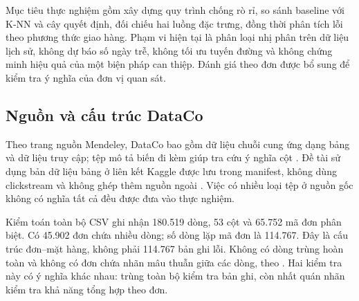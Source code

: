 Mục tiêu thực nghiệm gồm xây dựng quy trình chống rò rỉ, so sánh baseline
với K-NN và cây quyết định, đối chiếu hai luồng đặc trưng, đồng thời phân
tích lỗi theo phương thức giao hàng. Phạm vi hiện tại là phân loại nhị phân
trên dữ liệu lịch sử, không dự báo số ngày trễ, không tối ưu tuyến đường và
không chứng minh hiệu quả của một biện pháp can thiệp. Đánh giá theo đơn
được bổ sung để kiểm tra ý nghĩa của đơn vị quan sát.

\subsection{Nguồn và cấu trúc DataCo}
Theo trang nguồn Mendeley, DataCo bao gồm dữ liệu chuỗi cung ứng dạng bảng
và dữ liệu truy cập; tệp mô tả biến đi kèm giúp tra cứu ý nghĩa cột
\cite{dataco}. Đề tài sử dụng bản dữ liệu bảng ở liên kết Kaggle được lưu
trong manifest, không dùng clickstream và không ghép thêm nguồn ngoài
\cite{kaggle}. Việc có nhiều loại tệp ở nguồn gốc không có nghĩa tất cả đều
được đưa vào thực nghiệm.

Kiểm toán toàn bộ CSV ghi nhận 180.519 dòng, 53 cột và 65.752 mã đơn phân
biệt. Có 45.902 đơn chứa nhiều dòng; số dòng lặp mã đơn là 114.767. Đây là
cấu trúc đơn--mặt hàng, không phải 114.767 bản ghi lỗi. Không có dòng trùng
hoàn toàn và không có đơn chứa nhãn mâu thuẫn giữa các dòng, theo
. Hai kiểm tra này có ý nghĩa khác nhau: trùng toàn bộ
kiểm tra bản ghi, còn nhất quán nhãn kiểm tra khả năng tổng hợp theo đơn.

